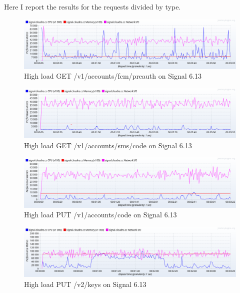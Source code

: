 Here I report the results for the requests divided by type.

\begin{figure}[H]
    \centering
    \includegraphics[width=\textwidth]{images/613/create-load-1}
    \caption{High load GET /v1/accounts/fcm/preauth on Signal 6.13}
    \label{fig:signalload1new}
\end{figure}

\begin{figure}[H]
    \centering
    \includegraphics[width=\textwidth]{images/613/create-load-2}
    \caption{High load GET /v1/accounts/sms/code on Signal 6.13}
    \label{fig:signalload2new}
\end{figure}

\begin{figure}[H]
    \centering
    \includegraphics[width=\textwidth]{images/613/create-load-3}
    \caption{High load PUT /v1/accounts/code on Signal 6.13}
    \label{fig:signalload3new}
\end{figure}

\begin{figure}[H]
    \centering
    \includegraphics[width=\textwidth]{images/613/create-load-4}
    \caption{High load PUT /v2/keys on Signal 6.13}
    \label{fig:signalload4new}
\end{figure}

